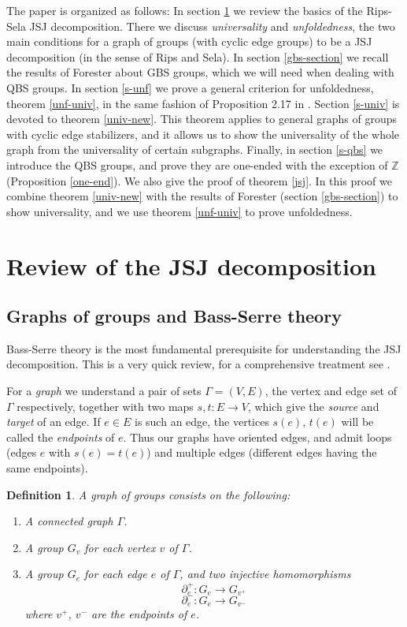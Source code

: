 \documentclass[12pt]{amsart}
\newtheorem{definition}[theorem]{Definition}
\newcommand{\Z}{\mathbb{Z}}
\begin{document}
The paper is organized as follows: In section \ref{jsjintro} we review the basics of the Rips-Sela JSJ decomposition. There we discuss {\em universality} and {\em unfoldedness}, the two main conditions for a graph of groups (with cyclic edge groups) to be a JSJ decomposition (in the sense of Rips and Sela). In section \ref{gbs-section} we recall the results of Forester about GBS groups, which we will need when dealing with QBS groups. In section \ref{s-unf} we prove a general criterion for unfoldedness, theorem \ref{unf-univ}, in the same fashion of Proposition 2.17 in \cite{forester}. Section \ref{s-univ} is devoted to theorem \ref{univ-new}. This theorem applies to general graphs of groups with cyclic edge stabilizers, and it allows us to show the universality of the whole graph from the universality of certain subgraphs. Finally, in section \ref{s-qbs} we introduce the QBS groups, and prove they are one-ended with the exception of $\Z$ (Proposition \ref{one-end}). We also give the proof of theorem \ref{jsj}. In this proof we combine theorem \ref{univ-new} with the results of Forester (section \ref{gbs-section}) to show universality, and we use theorem \ref{unf-univ} to prove unfoldedness. 

\section{Review of the JSJ decomposition} \label{jsjintro}

\subsection{Graphs of groups and Bass-Serre theory}

Bass-Serre theory is the most fundamental prerequisite for understanding the JSJ decomposition. This is a very quick review, for a comprehensive treatment see \cite{serre}. 

For a {\em graph} we understand a pair of sets $\Gamma = (V,E)$, the vertex and edge set of $\Gamma$ respectively, together with two maps $s,t:E\to V$, which give the {\em source} and {\em target} of an edge. If $e\in E$ is such an edge, the vertices $s(e)$, $t(e)$ will be called the {\em endpoints} of $e$. Thus our graphs have oriented edges, and admit loops (edges $e$ with $s(e)=t(e)$) and multiple edges (different edges having the same endpoints). 

\begin{definition} A {\em graph of groups} consists on the following:
\begin{enumerate}
\item A connected graph $\Gamma$.
\item A group $G_v$ for each vertex $v$ of $\Gamma$.
\item A group $G_e$ for each edge $e$ of $\Gamma$, and two injective homomorphisms \[ \partial^+_e:G_e\rightarrow G_{v^+} \] \[ \partial^-_e:G_e\rightarrow G_{v^-} \] where $v^+$, $v^-$ are the endpoints of $e$.
\end{enumerate}
\end{definition}
\end{document}

